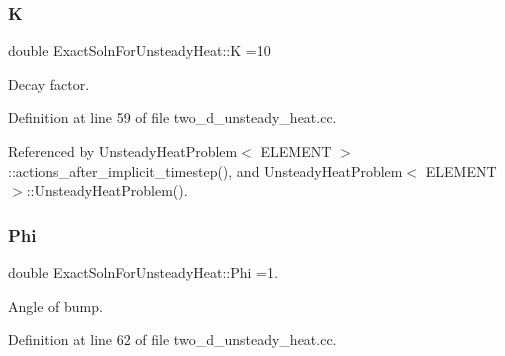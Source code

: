 \subsubsection{\texorpdfstring{K}{K}}
{\footnotesize\ttfamily double Exact\+Soln\+For\+Unsteady\+Heat\+::K =10}



Decay factor. 



Definition at line 59 of file two\+\_\+d\+\_\+unsteady\+\_\+heat.\+cc.



Referenced by Unsteady\+Heat\+Problem$<$ E\+L\+E\+M\+E\+N\+T $>$\+::actions\+\_\+after\+\_\+implicit\+\_\+timestep(), and Unsteady\+Heat\+Problem$<$ E\+L\+E\+M\+E\+N\+T $>$\+::\+Unsteady\+Heat\+Problem().

\mbox{\label{namespaceExactSolnForUnsteadyHeat_a630f9e8d892cfcc41cdaef25bfc87ca1}} 
\subsubsection{\texorpdfstring{Phi}{Phi}}
{\footnotesize\ttfamily double Exact\+Soln\+For\+Unsteady\+Heat\+::\+Phi =1.}



Angle of bump. 



Definition at line 62 of file two\+\_\+d\+\_\+unsteady\+\_\+heat.\+cc.

